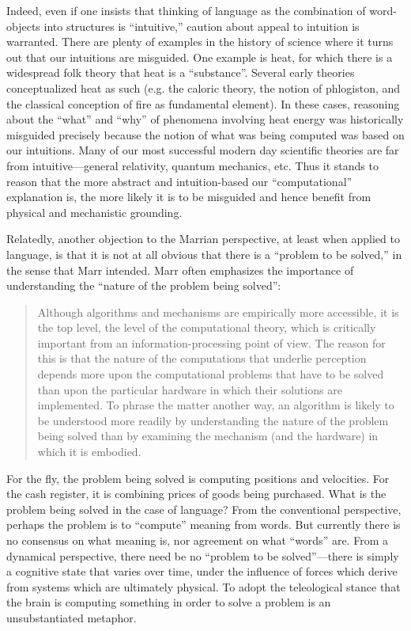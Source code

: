 Indeed, even if one insists that thinking of language as the combination of word-objects into structures is “intuitive,” caution about appeal to intuition is warranted. There are plenty of examples in the history of science where it turns out that our intuitions are misguided. One example is heat, for which there is a widespread folk theory that heat is a “substance”. Several early theories conceptualized heat as such (e.g. the caloric theory, the notion of phlogiston, and the classical conception of fire as fundamental element). In these cases, reasoning about the “what” and “why” of phenomena involving heat energy was historically misguided precisely because the notion of what was being computed was based on our intuitions. Many of our most successful modern day scientific theories are far from intuitive—general relativity, quantum mechanics, etc. Thus it stands to reason that the more abstract and intuition-based our “computational” explanation is, the more likely it is to be misguided and hence benefit from physical and mechanistic grounding.

  Relatedly, another objection to the Marrian perspective, at least when applied to language, is that it is not at all obvious that there is a “problem to be solved,” in the sense that Marr intended. Marr often emphasizes the importance of understanding the “nature of the problem being solved”:

\begin{quote}
Although algorithms and mechanisms are empirically more accessible, it is the top level, the level of the computational theory, which is critically important from an information-processing point of view. The reason for this is that the nature of the computations that underlie perception depends more upon the computational problems that have to be solved than upon the particular hardware in which their solutions are implemented. To phrase the matter another way, an algorithm is likely to be understood more readily by understanding the nature of the problem being solved than by examining the mechanism (and the hardware) in which it is embodied. \citep[27]{Marr1982}
\end{quote}

  For the fly, the problem being solved is computing positions and velocities. For the cash register, it is combining prices of goods being purchased. What is the problem being solved in the case of language? From the conventional perspective, perhaps the problem is to “compute” meaning from words. But currently there is no consensus on what meaning is, nor agreement on what “words” are. From a dynamical perspective, there need be no “problem to be solved”—there is simply a cognitive state that varies over time, under the influence of forces which derive from systems which are ultimately physical. To adopt the teleological stance that the brain is computing something in order to solve a problem is an unsubstantiated metaphor.

